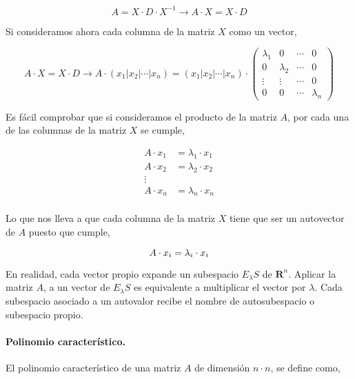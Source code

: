 \begin{equation*}
 A=X \cdot D \cdot X^{-1}\rightarrow A\cdot X= X\cdot D
\end{equation*}
\begin{paracol}{2}
Si consideramos ahora cada columna de la matriz $X$ como un vector,
\end{paracol}
\begin{equation*}
A\cdot X= X\cdot D \rightarrow A\cdot \left( x_1 | x_2 | \cdots | x_n \right)= \left( x_1 | x_2 | \cdots | x_n \right) \cdot\begin{pmatrix}
\lambda_1& 0 & \cdots & 0\\
0& \lambda_2& \cdots & 0\\
\vdots & \vdots& \cdots & 0\\
0& 0& \cdots & \lambda_n
\end{pmatrix}
\end{equation*}
\begin{paracol}{2}
Es fácil comprobar que si consideramos el producto de la matriz $A$, por cada una de las columnas de la matriz $X$ se cumple,
\end{paracol}
\begin{align*}
A\cdot x_1 &=\lambda_1 \cdot x_1 \\
A\cdot x_2 &=\lambda_2 \cdot x_2 \\
\vdots \\
A\cdot x_n &=\lambda_n \cdot x_n \\
\end{align*}
\begin{paracol}{2}
Lo que nos lleva a que cada columna de la matriz $X$ tiene que ser un autovector de $A$ puesto que cumple,
\end{paracol}
\begin{equation*}
A\cdot x_i =\lambda_i \cdot x_i \\
\end{equation*}
\begin{paracol}{2}
En realidad, cada vector propio expande un subespacio $E_{\lambda}S$ de $\mathbf{R}^n$. Aplicar la matriz $A$, a un vector de $E_{\lambda}S$ es equivalente a multiplicar el vector por $\lambda$. Cada subespacio asociado a un autovalor recibe el nombre de autosubespacio o subespacio propio. 
\paragraph{Polinomio característico.} El polinomio característico de una matriz $A$ de dimensión $n\cdot n$, se define como,
\end{paracol}
